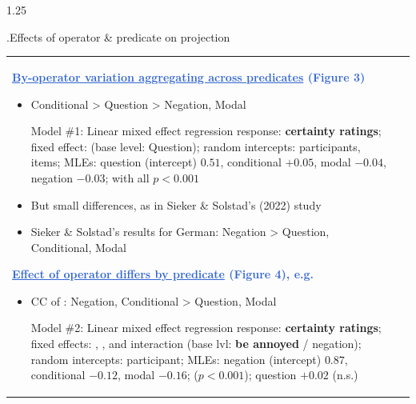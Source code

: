 \documentclass[final, table]{beamer}
\newlength{\colwidth}
\newlength{\mboxpreadjust}
\begin{document}
\begin{frame}[t]
\begin{columns}[t]
		\begin{column}{1.25\colwidth}
			\begin{normalbox}{\phantom.\hfill Effects of operator \& predicate on projection}
				\hspace{-.2cm}\begin{tabular}{p{.70\linewidth} p{.3\linewidth}}
					\textcolor{highlight}{\large \Raleway \bfseries \underline{By-operator variation aggregating across predicates} (Figure 3)}
					\vspace{-.15\baselineskip}
					\begin{itemize} \small
						\item Conditional > Question > Negation, Modal
							\vspace{\mboxpreadjust}
							\begin{modelbox}{Model \#1: Linear mixed effect regression}
								\footnotesize
								response: \textbf{certainty ratings}; fixed effect: \ophighlight{\textbf{operator}} (base level: Question);
								random intercepts: participants, items; \newline
								MLEs: question (intercept) $0.51$, conditional $+0.05$, modal $-0.04$, negation $-0.03$; with all $p < 0.001$
							\end{modelbox}
							\vspace{\mboxpreadjust}

						\item But small differences, as in Sieker \& Solstad’s (2022) study
						\item Sieker \& Solstad’s results for German: Negation > Question, Conditional, Modal

					\end{itemize}

				\vspace{-.1\baselineskip}
				\textcolor{highlight}{\large \Raleway \bfseries\underline{Effect of operator differs by predicate} (Figure 4), e.g.}
				\vspace{-.15\baselineskip}
				\begin{itemize}\small
					\item CC of \predhighlight{be annoyed}: Negation, Conditional > Question, Modal
						\vspace{\mboxpreadjust}
						\begin{modelbox}{Model \#2: Linear mixed effect regression}
							\footnotesize
							response: \textbf{certainty ratings}; fixed effects: \ophighlight{operator}, \predhighlight{predicate}, and interaction (base lvl: \textbf{be annoyed} / negation); random intercepts: participant; 
							MLEs: negation (intercept) $0.87$, conditional $-0.12$, modal $-0.16$; ($p < 0.001$); question $+0.02$ (n.s.)
						\end{modelbox}


\end{itemize}
\end{tabular}
\end{normalbox}
\end{column}
\end{columns}
\end{frame}
\end{document}
